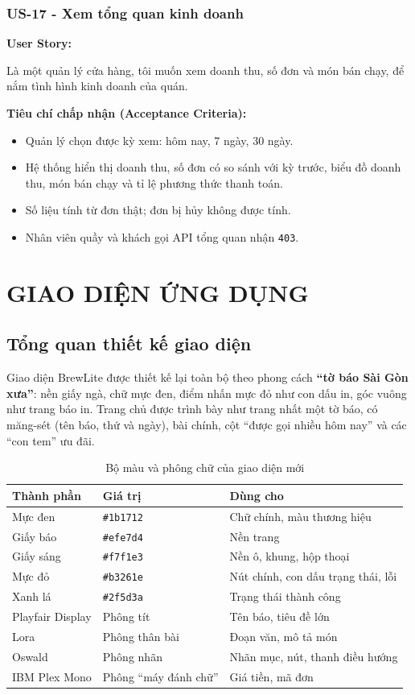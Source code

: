 \documentclass[12pt,a4paper]{article}
\newcommand{\userstory}[2]{%
  \noindent\textbf{User Story:}\par
  #1\par
  \hspace*{\parindent}\textbf{Tiêu chí chấp nhận (Acceptance Criteria):}
  \begin{itemize}
    #2
  \end{itemize}}
\begin{document}
\subsubsection{US-17 - Xem tổng quan kinh doanh}
\userstory{Là một quản lý cửa hàng, tôi muốn xem doanh thu, số đơn và món bán chạy, để nắm tình hình kinh doanh của quán.}{
  \item Quản lý chọn được kỳ xem: hôm nay, 7 ngày, 30 ngày.
  \item Hệ thống hiển thị doanh thu, số đơn có so sánh với kỳ trước, biểu đồ doanh thu, món bán chạy và tỉ lệ phương thức thanh toán.
  \item Số liệu tính từ đơn thật; đơn bị hủy không được tính.
  \item Nhân viên quầy và khách gọi API tổng quan nhận \texttt{403}.
}

\section{GIAO DIỆN ỨNG DỤNG}
\subsection{Tổng quan thiết kế giao diện}
Giao diện BrewLite được thiết kế lại toàn bộ theo phong cách \textbf{``tờ báo Sài Gòn xưa''}: nền giấy ngà, chữ mực đen, điểm nhấn mực đỏ như con dấu in, góc vuông như trang báo in. Trang chủ được trình bày như trang nhất một tờ báo, có măng-sét (tên báo, thứ và ngày), bài chính, cột ``được gọi nhiều hôm nay'' và các ``con tem'' ưu đãi.

\begin{table}[H]
\centering
\caption{Bộ màu và phông chữ của giao diện mới}
\begin{tabularx}{\textwidth}{|l|l|X|}
\hline
\textbf{Thành phần} & \textbf{Giá trị} & \textbf{Dùng cho} \\ \hline
Mực đen   & \texttt{\#1b1712} & Chữ chính, màu thương hiệu \\ \hline
Giấy báo  & \texttt{\#efe7d4} & Nền trang \\ \hline
Giấy sáng & \texttt{\#f7f1e3} & Nền ô, khung, hộp thoại \\ \hline
Mực đỏ    & \texttt{\#b3261e} & Nút chính, con dấu trạng thái, lỗi \\ \hline
Xanh lá   & \texttt{\#2f5d3a} & Trạng thái thành công \\ \hline
Playfair Display & Phông tít & Tên báo, tiêu đề lớn \\ \hline
Lora      & Phông thân bài & Đoạn văn, mô tả món \\ \hline
Oswald    & Phông nhãn & Nhãn mục, nút, thanh điều hướng \\ \hline
IBM Plex Mono & Phông ``máy đánh chữ'' & Giá tiền, mã đơn \\ \hline
\end{tabularx}
\end{table}
\end{document}
